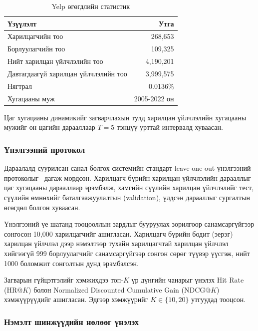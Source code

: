 \documentclass[conference]{IEEEtran}
\begin{document}
\begin{table}[h]
\centering
\renewcommand{\arraystretch}{1.3}
\setlength{\tabcolsep}{10pt}
\caption{Yelp өгөгдлийн статистик}

\label{tab:dataset}
\begin{tabular}{|l|r|}
\hline
\textbf{Үзүүлэлт} & \textbf{Утга} \\
\hline
Харилцагчийн тоо & 268{,}653 \\
\hline
Борлуулагчийн тоо & 109{,}325 \\
\hline
Нийт харилцан үйлчлэлийн тоо & 4{,}190{,}201 \\
\hline
Давтагдаагүй харилцан үйлчлэлийн тоо & 3{,}999{,}575 \\
\hline
Нягтрал & 0.0136\% \\
\hline
Хугацааны муж & 2005-2022 он \\
\hline
\end{tabular}
\end{table}

Цаг хугацааны динамикийг загварчлахын тулд харилцан үйлчлэлийн хугацааны мужийг он цагийн дарааллаар $T=5$ тэнцүү урттай интервалд хуваасан.

\subsubsection{Үнэлгээний протокол}

Дараалалд суурилсан санал болгох системийн стандарт leave-one-out үнэлгээний протоколыг~\cite{selfgnn2024, kang2018sasrec} дагаж мөрдсөн. Харилцагч бүрийн харилцан үйлчлэлийн дарааллыг цаг хугацааны дарааллаар эрэмбэлж, хамгийн сүүлийн харилцан үйлчлэлийг тест, сүүлийн өмнөхийг баталгаажуулалтын (validation), үлдсэн дарааллыг сургалтын өгөгдөл болгон хуваасан.

Үнэлгээний үе шатанд тооцооллын зардлыг бууруулах зорилгоор санамсаргүйгээр сонгосон 10{,}000 харилцагчийг ашигласан. Харилцагч бүрийн бодит (эерэг) харилцан үйлчлэл дээр нэмэлтээр тухайн харилцагчтай харилцан үйлчлэл хийгээгүй 999 борлуулагчийг санамсаргүйгээр сонгон сөрөг түүвэр үүсгэж, нийт 1000 боломжит сонголтын дунд эрэмбэлсэн.

Загварын гүйцэтгэлийг хэмжихдээ топ-$K$ үр дүнгийн чанарыг үнэлэх Hit Rate (HR@$K$) болон Normalized Discounted Cumulative Gain (NDCG@$K$) хэмжүүрүүдийг ашигласан. Эдгээр хэмжүүрийг $K \in \{10, 20\}$ утгуудад тооцсон.

\subsubsection{Нэмэлт шинжүүдийн нөлөөг үнэлэх}
 
\end{document}
